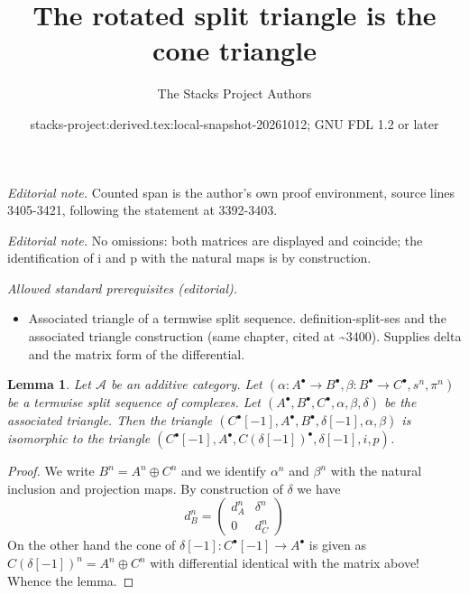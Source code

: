 \documentclass{stacks-project}
\title{The rotated split triangle is the cone triangle}
\author{The Stacks Project Authors}
\date{stacks-project:derived.tex:local-snapshot-20261012; GNU FDL 1.2 or later}
\theoremstyle{plain}
\newtheorem{lemma}[subsection]{Lemma}
\theoremstyle{definition}
\theoremstyle{remark}
\numberwithin{equation}{subsection}
\begin{document}
\maketitle
\noindent\textit{Editorial note.} Counted span is the author's own proof environment, source lines 3405-3421, following the statement at 3392-3403.\par\medskip
\noindent\textit{Editorial note.} No omissions: both matrices are displayed and coincide; the identification of i and p with the natural maps is by construction.\par\medskip
\noindent\textit{Allowed standard prerequisites (editorial).}\begin{itemize}
\item Associated triangle of a termwise split sequence. definition-split-ses and the associated triangle construction (same chapter, cited at \textasciitilde{}3400). Supplies delta and the matrix form of the differential.
\end{itemize}\medskip
\begin{lemma}
\label{lemma-rotate-triangle}
Let $\mathcal{A}$ be an additive category. Let
$(\alpha : A^\bullet \to B^\bullet, \beta : B^\bullet \to C^\bullet, s^n,
\pi^n)$ be a termwise split sequence of complexes.
Let $(A^\bullet, B^\bullet, C^\bullet, \alpha, \beta, \delta)$
be the associated triangle.
Then the triangle
$(C^\bullet[-1], A^\bullet, B^\bullet, \delta[-1], \alpha, \beta)$
is isomorphic to the triangle
$(C^\bullet[-1], A^\bullet, C(\delta[-1])^\bullet, \delta[-1], i, p)$.
\end{lemma}

\begin{proof}
We write $B^n = A^n \oplus C^n$ and we identify $\alpha^n$ and $\beta^n$
with the natural inclusion and projection maps. By construction of $\delta$ we
have
$$
d_B^n =
\left(
\begin{matrix}
d_A^n & \delta^n \\
0 & d_C^n
\end{matrix}
\right)
$$
On the other hand the cone of $\delta[-1] : C^\bullet[-1] \to A^\bullet$
is given as $C(\delta[-1])^n = A^n \oplus C^n$ with differential identical
with the matrix above! Whence the lemma.
\end{proof}
\end{document}
